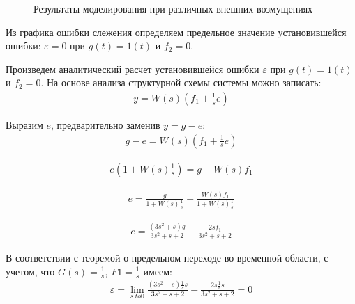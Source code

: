 \documentclass[a4paper, 11pt]{article}
\begin{document}
\begin{figure}[h!]
\centering
{}
\caption{Результаты моделирования при различных внешних возмущениях}
\end{figure}

\par 	
Из графика ошибки слежения определяем предельное значение установившейся ошибки: $\varepsilon = 0$ при $g(t)=1(t)$  и $f_2=0$.

\par 
Произведем аналитический расчет установившейся ошибки $\varepsilon$ при $g(t)=1(t)$  и $f_2=0$. На основе анализа структурной схемы системы можно записать:
\begin{align}
\displaystyle y=W(s)(f_1+\frac{1}{s}e)
\end{align} 

\par 
Выразим $e$, предварительно заменив $y=g-e$:
\begin{align}
\displaystyle g-e=W(s)(f_1+\frac{1}{s}e)
\end{align}

\begin{align}
\displaystyle e(1+W(s)\frac{1}{s})=g-W(s)f_1
\end{align}

\begin{align}
e=\displaystyle \frac{g}{1+W(s)\frac{1}{s}}-\frac{W(s)f_1}{1+W(s)\frac{1}{s}}
\end{align}

\begin{align}
e=\displaystyle \frac{(3s^2+s)g}{3s^2+s+2}-\frac{2sf_1}{3s^2+s+2}
\end{align}

\par 
В соответствии с теоремой о предельном переходе во временной области, с учетом, что $G(s) = \frac{1}{s}$, $F1= \frac{1}{s}$ имеем:
\begin{align}
\varepsilon=\lim_{s\ to 0}\displaystyle\frac{(3s^2+s)\frac{1}{s}s}{3s^2+s+2}-\frac{2s\frac{1}{s}s}{3s^2+s+2}=0
\end{align}
\end{document}
